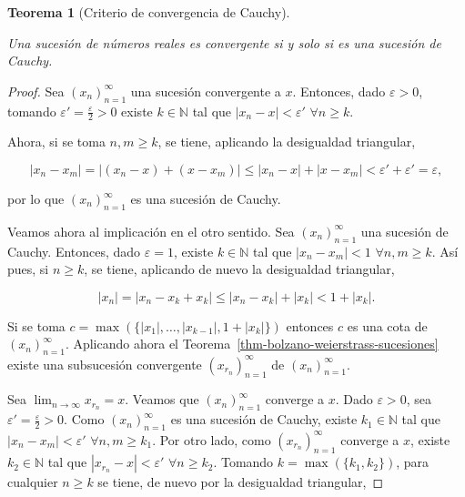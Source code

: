 \documentclass[
  a4paper,
]{scrreport}
\theoremstyle{definition}
\theoremstyle{plain}
\theoremstyle{definition}
\theoremstyle{plain}
\newtheorem{theorem}{Teorema}[chapter]
\theoremstyle{plain}
\theoremstyle{remark}
\begin{document}
\leavevmode{}%
\begin{theorem}[Criterio de convergencia de
Cauchy]\label{thm-criterio-convergencia-cauchy}

Una sucesión de números reales es convergente si y solo si es una
sucesión de Cauchy.

\end{theorem}

\begin{tcolorbox}[enhanced jigsaw, breakable, arc=.35mm, colbacktitle=quarto-callout-note-color!10!white, toptitle=1mm, opacityback=0, colframe=quarto-callout-note-color-frame, colback=white, left=2mm, bottomrule=.15mm, opacitybacktitle=0.6, title=\textcolor{quarto-callout-note-color}{\faInfo}\hspace{0.5em}{Demostración}, toprule=.15mm, titlerule=0mm, coltitle=black, rightrule=.15mm, bottomtitle=1mm, leftrule=.75mm]

\begin{proof}

Sea \((x_n)_{n=1}^\infty\) una sucesión convergente a \(x\). Entonces,
dado \(\varepsilon>0\), tomando \(\varepsilon'=\frac{\varepsilon}{2}>0\)
existe \(k\in\mathbb{N}\) tal que \(|x_n-x|<\varepsilon'\)
\(\forall n\geq k\).

Ahora, si se toma \(n,m\geq k\), se tiene, aplicando la desigualdad
triangular,

\[
|x_n-x_m|=|(x_n-x)+(x-x_m)| \leq |x_n-x| + |x-x_m| < \varepsilon' +\varepsilon' = \varepsilon,
\]

por lo que \((x_n)_{n=1}^\infty\) es una sucesión de Cauchy.

Veamos ahora al implicación en el otro sentido. Sea
\((x_n)_{n=1}^\infty\) una sucesión de Cauchy. Entonces, dado
\(\varepsilon=1\), existe \(k\in\mathbb{N}\) tal que \(|x_n-x_m|<1\)
\(\forall n,m\geq k\). Así pues, si \(n\geq k\), se tiene, aplicando de
nuevo la desigualdad triangular,

\[
|x_n| = |x_n-x_k+x_k| \leq |x_n-x_k|+|x_k|<1+|x_k|.
\]

Si se toma \(c=\max(\{|x_1|, \ldots, |x_{k-1}|,1+|x_k|\})\) entonces
\(c\) es una cota de \((x_n)_{n=1}^\infty\). Aplicando ahora el
Teorema~\ref{thm-bolzano-weierstrass-sucesiones} existe una subsucesión
convergente \((x_{r_n})_{n=1}^\infty\) de \((x_n)_{n=1}^\infty\).

Sea \(\lim_{n\to\infty}x_{r_n}=x\). Veamos que \((x_n)_{n=1}^\infty\)
converge a \(x\). Dado \(\varepsilon>0\), sea
\(\varepsilon'=\frac{\varepsilon}{2}>0\). Como \((x_n)_{n=1}^\infty\) es
una sucesión de Cauchy, existe \(k_1\in\mathbb{N}\) tal que
\(|x_n-x_m|<\varepsilon'\) \(\forall n,m\geq k_1\). Por otro lado, como
\((x_{r_n})_{n=1}^\infty\) converge a \(x\), existe \(k_2\in\mathbb{N}\)
tal que \(|x_{r_n}-x|<\varepsilon'\) \(\forall n\geq k_2\). Tomando
\(k=\max(\{k_1,k_2\})\), para cualquier \(n\geq k\) se tiene, de nuevo
por la desigualdad triangular,


\end{proof}
\end{tcolorbox}
\end{document}
